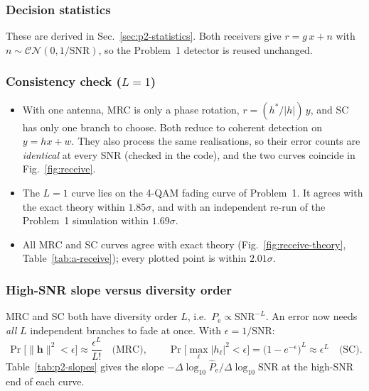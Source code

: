 \documentclass[11pt,a4paper]{article}
\newcommand{\snr}{\mathrm{SNR}}
\newcommand{\CN}{\mathcal{CN}}
\newcommand{\norm}[1]{\lVert #1 \rVert}
\newcommand{\abs}[1]{\lvert #1 \rvert}
\newcommand{\Pe}{P_{\mathrm{e}}}
\newcommand{\hPe}{\hat{P}_{\mathrm{e}}}
\newcommand{\h}{\mathbf{h}}
\begin{document}
\subsubsection{Decision statistics}
\label{sec:p2-disc-statistics}

These are derived in Sec.~\ref{sec:p2-statistics}.
Both receivers give $r = g\,x + n$ with $n \sim \CN(0, 1/\snr)$, so the Problem~1
detector is reused unchanged.

\subsubsection{Consistency check (\texorpdfstring{$L = 1$}{L = 1})}
\label{sec:p2-consistency}
\begin{itemize}
  \item With one antenna, MRC is only a phase rotation, $r = (h^*/\abs{h})\,y$, and SC
        has only one branch to choose. Both reduce to coherent detection on
        $y = hx + w$. They also process the same realisations, so their error counts
        are \emph{identical} at every SNR (checked in the code), and the two curves
        coincide in Fig.~\ref{fig:receive}.
  \item The $L = 1$ curve lies on the 4-QAM fading curve of Problem~1. It agrees
        with the exact theory within $1.85\sigma$, and with an independent re-run of
        the Problem~1 simulation within $1.69\sigma$.
  \item All MRC and SC curves agree with exact theory (Fig.~\ref{fig:receive-theory},
        Table~\ref{tab:a-receive}); every plotted point is within $2.01\sigma$.
\end{itemize}

\subsubsection{High-SNR slope versus diversity order}
\label{sec:p2-slope}

MRC and SC both have diversity
order $L$, i.e.\ $\Pe \propto \snr^{-L}$. An error now needs \emph{all} $L$
independent branches to fade at once. With $\epsilon = 1/\snr$:
\begin{equation}
  \Pr\big[\norm{\h}^2 < \epsilon\big] \approx \frac{\epsilon^L}{L!} \quad\text{(MRC)},
  \qquad
  \Pr\big[\max_\ell \abs{h_\ell}^2 < \epsilon\big] = \big(1 - e^{-\epsilon}\big)^L \approx \epsilon^L \quad\text{(SC)}.
  \label{eq:deep-fade-L}
\end{equation}
Table~\ref{tab:p2-slopes} gives the slope $-\Delta\log_{10}\hPe/\Delta\log_{10}\snr$ at
the high-SNR end of each curve.
\end{document}
